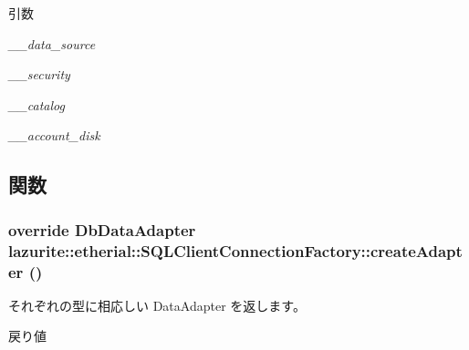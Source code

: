 \begin{DoxyParams}{引数}
\item[{\em \_\-\_\-data\_\-source}]\item[{\em \_\-\_\-security}]\item[{\em \_\-\_\-catalog}]\item[{\em \_\-\_\-account\_\-disk}]\end{DoxyParams}


\subsection{関数}
\hypertarget{classlazurite_1_1etherial_1_1_s_q_l_client_connection_factory_a08a4e0e2bb826ee05ba61ddebafae227}{
\subsubsection[{createAdapter}]{\setlength{\rightskip}{0pt plus 5cm}override DbDataAdapter lazurite::etherial::SQLClientConnectionFactory::createAdapter ()}}
\label{classlazurite_1_1etherial_1_1_s_q_l_client_connection_factory_a08a4e0e2bb826ee05ba61ddebafae227}


それぞれの型に相応しい DataAdapter を返します。 \begin{DoxyReturn}{戻り値}

\end{DoxyReturn}


